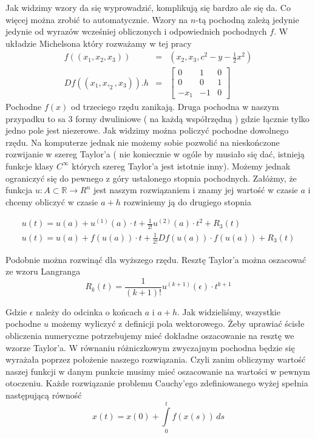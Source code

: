 Jak widzimy wzory da się wyprowadzić, komplikują się bardzo ale się da. Co więcej można zrobić to automatycznie. Wzory na $n$-tą pochodną zależą jedynie jedynie od 
wyrazów wcześniej obliczonych i odpowiednich pochodnych $ f $. W układzie Michelsona który rozważamy w tej pracy 
\begin{eqnarray*}
  f((x_1,x_2,x_3)) & = & (x_2,x_3, c^2 - y - \frac{1}{2}x^2) \\
  Df((x_1,x,_2,x_3)).h&  = &
  \begin{bmatrix}
    0 & 1 & 0 \\	
    0 & 0 & 1 \\
   -x_1 & -1 & 0 
  \end{bmatrix}
\end{eqnarray*}
Pochodne $ f(x) $ od trzeciego rzędu zanikają. Druga pochodna w naszym przypadku to sa 3 formy dwuliniowe ( na każdą współrzędną ) gdzie
łącznie tylko jedno pole jest niezerowe.
Jak widzimy można policzyć pochodne dowolnego rzędu. Na komputerze jednak nie możemy sobie pozwolić na nieskończone rozwijanie
w szereg Taylor'a ( nie koniecznie w ogóle by musiało się dać, istnieją funkcje klasy $ C^{\infty} $ których szereg Taylor'a jest istotnie inny).
Możemy jednak ograniczyć się do pewnego z góry ustalonego stopnia pochodnych. Załóżmy, że funkcja $ u : A \subset \mathbb R \to R^n $ jest 
naszym rozwiązaniem i znamy jej wartość w czasie $ a $ i chcemy obliczyć w czasie $ a + h $ rozwiniemy ją do drugiego stopnia

\begin{eqnarray*}
 u(t) = u(a) + u^{(1)}(a) \cdot t + \frac{1}{2!}u^{(2)}(a) \cdot t^2 + R_3(t) \\
 u(t) = u(a) + f(u(a)) \cdot t + \frac{1}{2!} Df(u(a)) \cdot f(u(a)) + R_3(t) 
\end{eqnarray*}

Podobnie można rozwinąć dla wyższego rzędu. 
Resztę Taylor'a można oszacować ze wzoru Langranga
$$
  R_k(t) = \frac{1}{(k+1)!}u^{(k+1)}(\epsilon) \cdot t^{k+1}
$$

Gdzie $ \epsilon $ należy do odcinka o końcach $ a $ i $ a+h$.
Jak widzieliśmy, wszystkie pochodne $ u $ możemy wyliczyć z definicji pola wektorowego. 
Żeby uprawiać ścisłe obliczenia numeryczne potrzebujemy mieć dokładne oszacowanie na resztę we wzorze Taylor'a. W równaniu różniczkowym 
zwyczajnym pochodna będzie się wyrażała poprzez położenie naszego rozwiązania. Czyli zanim obliczymy wartość naszej funkcji w danym punkcie
musimy mieć oszacowanie na wartości w pewnym otoczeniu. 
Każde rozwiązanie problemu Cauchy'ego zdefiniowanego wyżej spełnia następującą równość
\begin{equation}
\label{diffEq}
  x(t) = x(0) + \int\limits^t_0 f(x(s)) \,ds
\end{equation}

